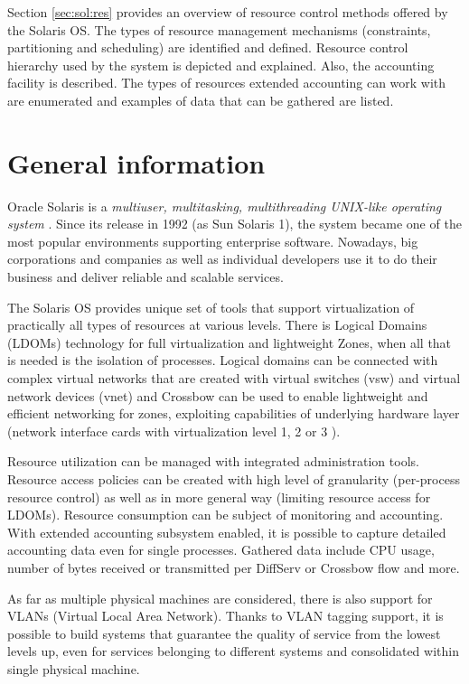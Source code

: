 \documentclass[11pt]{book}
\begin{document}
    Section \ref{sec:sol:res} provides an overview of resource control methods offered by the Solaris OS. The types
    of resource management mechanisms (constraints, partitioning and scheduling) are identified and defined. Resource
    control hierarchy used by the system is depicted and explained. Also, the accounting facility is described. The
    types of resources extended accounting can work with are enumerated and examples of data that can be gathered are
    listed.


    \section{General information}
    \label{sec:sol:general}

      Oracle Solaris is a \textit{multiuser, multitasking, multithreading UNIX-like operating system} \cite{reference}.
      Since its release in 1992 (as Sun Solaris 1), the system became one of the most popular environments supporting
      enterprise software. Nowadays, big corporations and companies as well as individual developers use it to do their
      business and deliver reliable and scalable services.

      The Solaris OS provides unique set of tools that support virtualization of practically all types of resources at
      various levels. There is Logical Domains (LDOMs) technology for full virtualization and lightweight Zones, when
      all that is needed is the isolation of processes. Logical domains can be connected with complex virtual networks
      that are created with virtual switches (vsw) and virtual network devices (vnet) \cite{ldomag} and Crossbow can be
      used to enable lightweight and efficient networking for zones, exploiting capabilities of underlying hardware
      layer (network interface cards with virtualization level 1, 2 or 3 \cite{santos}).

      Resource utilization can be managed with integrated administration tools. Resource access policies can be created
      with high level of granularity (per-process resource control) as well as in more general way (limiting resource
      access for LDOMs). Resource consumption can be subject of monitoring and accounting. With extended accounting
      subsystem enabled, it is possible to capture detailed accounting data even for single processes. Gathered data
      include CPU usage, number of bytes received or transmitted per DiffServ or Crossbow flow and more.

      As far as multiple physical machines are considered, there is also support for VLANs (Virtual Local Area Network).
      Thanks to VLAN tagging support, it is possible to build systems that guarantee the quality of service from the
      lowest levels up, even for services belonging to different systems and consolidated within single physical machine.
\end{document}
